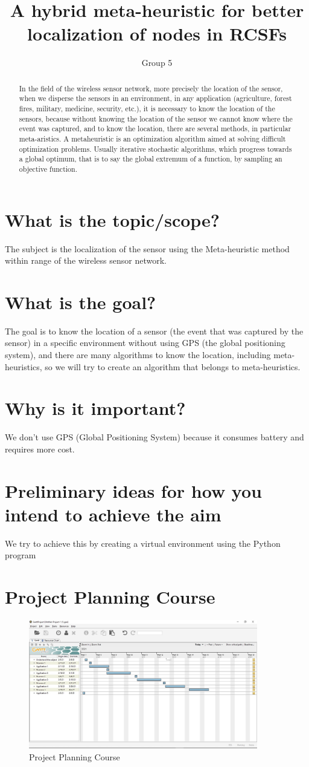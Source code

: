 \documentclass{article}
\title{A hybrid meta-heuristic for better localization of nodes in RCSFs}
\author{Group 5}
\begin{document}
\maketitle


\begin{abstract}
    In the field of the wireless sensor network, more precisely the location of the sensor, when we disperse the sensors in an environment, in any application (agriculture, forest fires, military, medicine, security, etc.), it is necessary to know the location of the sensors, because without knowing the location of the sensor we cannot know where the event was captured, and to know the location, there are several methods, in particular meta-aristics.
     A metaheuristic is an optimization algorithm aimed at solving difficult optimization problems. Usually iterative stochastic algorithms, which progress towards a global optimum, that is to say the global extremum of a function, by sampling an objective function.
\end{abstract}

\section{ What is the topic/scope?}
The subject is the localization of the sensor using the Meta-heuristic method within range of the wireless sensor network.



\section{ What is the goal?}
The goal is to know the location of a sensor (the event that was captured by the sensor) in a specific environment without using GPS (the global positioning system), and there are many algorithms to know the location, including meta-heuristics, so we will try to create an algorithm that belongs to meta-heuristics.
\section{ Why is it important?}
We don't use GPS (Global Positioning System) because it consumes battery and requires more cost.
\section{ Preliminary ideas for how you intend to achieve the aim}
We try to achieve this by creating a virtual environment using the Python program

\section{Project Planning Course}
\begin{figure}[ht!]
\centering
\includegraphics[width=100mm]{GG.jpg}
\caption{Project Planning Course \label{overflow}}
\end{figure}
\end{document}
